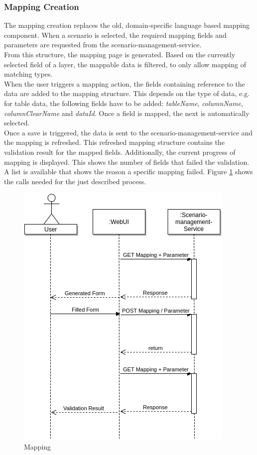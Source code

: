 \subsubsection{Mapping Creation}
The mapping creation replaces the old, domain-specific language based mapping component. When a scenario is selected, the required mapping fields and parameters are requested from the scenario-management-service.\\
From this structure, the mapping page is generated. Based on the currently selected field of a layer, the mappable data is filtered, to only allow mapping of matching types.\\
When the user triggers a mapping action, the fields containing reference to the data are added to the mapping structure. This depends on the type of data, e.g. for table data, the following fields have to be added: \textit{tableName}, \textit{columnName}, \textit{columnClearName} and \textit{dataId}. Once a field is mapped, the next is automatically selected.\\
Once a save is triggered, the data is sent to the scenario-management-service and the mapping is refreshed. This refreshed mapping structure contains the validation result for the mapped fields. Additionally, the current progress of mapping is displayed. This shows the number of fields that failed the validation. A list is available that shows the reason a specific mapping failed. Figure \ref{fig:mapping} shows the calls needed for the just described process.
\begin{figure}[H]
	\centering\includegraphics[width=.65\textwidth]{res/Mapping}
	\caption{Mapping}
	\label{fig:mapping}
\end{figure}


